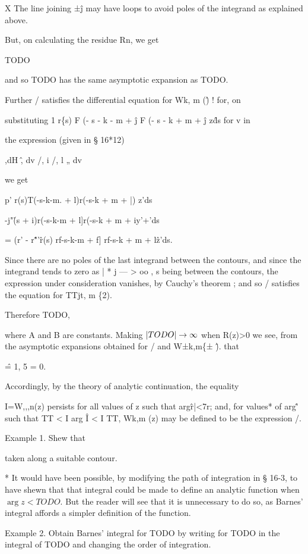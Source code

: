 X The line joining ±\^j may have loops to avoid poles of the integrand
as explained above.

%
%
But, on calculating the residue Rn, we get

TODO

and so TODO has the same asymptotic expansion as TODO.

Further / satisfies the differential equation for Wk, m (\^) ! for, on

substituting 1 r\{s) F (- s - k - m + \^j F (- s - k + m + \^j z\^ds
for v in

the expression (given in § 16*12)

,dH \^, dv /, i /, l „ dv

we get

p' r(s)T(-s-k-m. + l)r(-s-k + m + |) z'ds

-j"\r(s + i)r(-s-k-m + l]r(-s-k + m + iy'+'ds

= (r' - r\^"'\^ r(s) rf-s-k-m + f] rf-s-k + m + l\^z'ds.

Since there are no poles of the last integrand between the contours,
and since the integrand tends to zero as | * j — > oo , s being
between the contours, the expression under consideration vanishes, by
Cauchy's theorem ; and so / satisfies the equation for TTjt, m \{2).

Therefore TODO,

where A and B are constants. Making $\left| TODO \right| \rightarrow \infty$
when R(z)>0 we see, from the asymptotic expansions obtained for / and
W±k,m\{± \^). that

\^ = 1, 5 = 0.

Accordingly, by the theory of analytic continuation, the equality

I=W,,,n(z) persists for all values of z such that arg\^r|<7r; and, for
values* of arg\^' such that TT < I arg \^ I < I TT, Wk,m (z) may be
defined to be the expression /.

Example 1. Shew that

taken along a suitable contour.

* It would have been possible, by modifying the path of integration in
§ 16-3, to have shewn that that integral could be made to define an
analytic function when $\arg z < TODO$. But the reader will see that
it is unnecessary to do so, as Barnes' integral affords a simpler
definition of the function.

%
%

Example 2. Obtain Barnes' integral for TODO by writing for TODO in the
integral of TODO and changing the order of integration.

